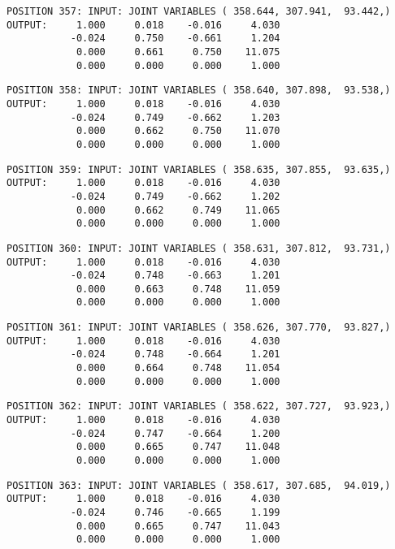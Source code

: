\begin{verbatim}
POSITION 357: INPUT: JOINT VARIABLES ( 358.644, 307.941,  93.442,)
OUTPUT:     1.000     0.018    -0.016     4.030
           -0.024     0.750    -0.661     1.204
            0.000     0.661     0.750    11.075
            0.000     0.000     0.000     1.000
\end{verbatim} \pagebreak[1]\begin{verbatim}
POSITION 358: INPUT: JOINT VARIABLES ( 358.640, 307.898,  93.538,)
OUTPUT:     1.000     0.018    -0.016     4.030
           -0.024     0.749    -0.662     1.203
            0.000     0.662     0.750    11.070
            0.000     0.000     0.000     1.000
\end{verbatim} \pagebreak[1]\begin{verbatim}
POSITION 359: INPUT: JOINT VARIABLES ( 358.635, 307.855,  93.635,)
OUTPUT:     1.000     0.018    -0.016     4.030
           -0.024     0.749    -0.662     1.202
            0.000     0.662     0.749    11.065
            0.000     0.000     0.000     1.000
\end{verbatim} \pagebreak[1]\begin{verbatim}
POSITION 360: INPUT: JOINT VARIABLES ( 358.631, 307.812,  93.731,)
OUTPUT:     1.000     0.018    -0.016     4.030
           -0.024     0.748    -0.663     1.201
            0.000     0.663     0.748    11.059
            0.000     0.000     0.000     1.000
\end{verbatim} \pagebreak[1]\begin{verbatim}
POSITION 361: INPUT: JOINT VARIABLES ( 358.626, 307.770,  93.827,)
OUTPUT:     1.000     0.018    -0.016     4.030
           -0.024     0.748    -0.664     1.201
            0.000     0.664     0.748    11.054
            0.000     0.000     0.000     1.000
\end{verbatim} \pagebreak[1]\begin{verbatim}
POSITION 362: INPUT: JOINT VARIABLES ( 358.622, 307.727,  93.923,)
OUTPUT:     1.000     0.018    -0.016     4.030
           -0.024     0.747    -0.664     1.200
            0.000     0.665     0.747    11.048
            0.000     0.000     0.000     1.000
\end{verbatim} \pagebreak[1]\begin{verbatim}
POSITION 363: INPUT: JOINT VARIABLES ( 358.617, 307.685,  94.019,)
OUTPUT:     1.000     0.018    -0.016     4.030
           -0.024     0.746    -0.665     1.199
            0.000     0.665     0.747    11.043
            0.000     0.000     0.000     1.000
\end{verbatim} \pagebreak[1]\begin{verbatim}

\end{verbatim}
